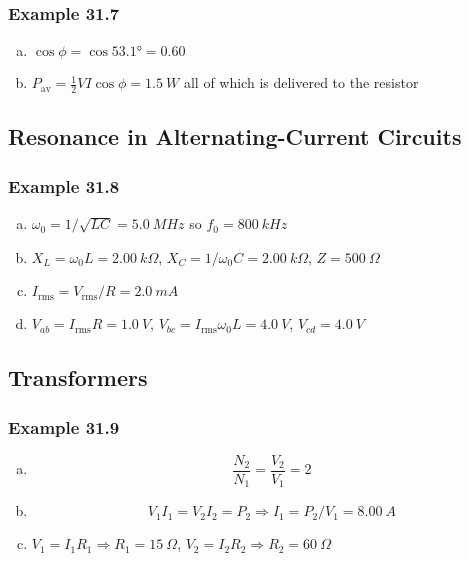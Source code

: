 \documentclass{article}
\begin{document}
\subsubsection{Example 31.7}

\begin{enumerate}[(a)]
  \item $\cos \phi = \cos \ang{53.1} = 0.60$

  \item $P_\text{av} = \frac{1}{2} V I \cos \phi = \qty{1.5}{W}$ all of which is delivered to the resistor
\end{enumerate}

\subsection{Resonance in Alternating-Current Circuits}

\subsubsection{Example 31.8}

\begin{enumerate}[(a)]
  \item $\omega_0 = 1 / \sqrt{L C} = \qty{5.0}{MHz}$ so $f_0 = \qty{800}{kHz}$

  \item $X_L = \omega_0 L = \qty{2.00}{k \Omega}$, $X_C = 1 / \omega_0 C = \qty{2.00}{k \Omega}$, $Z = \qty{500}{\Omega}$

  \item $I_\text{rms} = V_\text{rms} / R = \qty{2.0}{mA}$

  \item $V_{ab} = I_\text{rms} R = \qty{1.0}{V}$, $V_{bc} = I_\text{rms} \omega_0 L = \qty{4.0}{V}$, $V_{cd} = \qty{4.0}{V}$
\end{enumerate}

\subsection{Transformers}

\subsubsection{Example 31.9}

\begin{enumerate}[(a)]
  \item \[\frac{N_2}{N_1} = \frac{V_2}{V_1} = 2\]

  \item \[V_1 I_1 = V_2 I_2 = P_2 \Rightarrow I_1 = P_2 / V_1 = \qty{8.00}{A}\]

  \item $V_1 = I_1 R_1 \Rightarrow R_1 = \qty{15}{\Omega}$, $V_2 = I_2 R_2 \Rightarrow R_2 = \qty{60}{\Omega}$
\end{enumerate}
\end{document}
